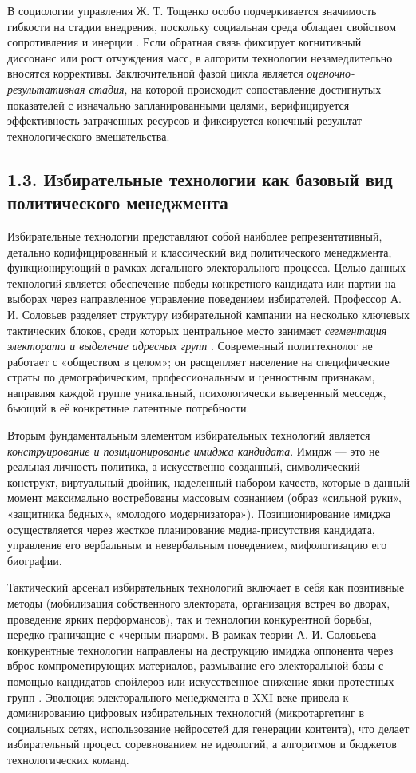 В социологии управления Ж. Т. Тощенко особо подчеркивается значимость гибкости на стадии внедрения, поскольку социальная среда обладает свойством сопротивления и инерции \cite{Toschenko}. Если обратная связь фиксирует когнитивный диссонанс или рост отчуждения масс, в алгоритм технологии незамедлительно вносятся коррективы. Заключительной фазой цикла является \textit{оценочно-результативная стадия}, на которой происходит сопоставление достигнутых показателей с изначально запланированными целями, верифицируется эффективность затраченных ресурсов и фиксируется конечный результат технологического вмешательства.

\subsection{1.3. Избирательные технологии как базовый вид политического менеджмента}

Избирательные технологии представляют собой наиболее репрезентативный, детально кодифицированный и классический вид политического менеджмента, функционирующий в рамках легального электорального процесса. Целью данных технологий является обеспечение победы конкретного кандидата или партии на выборах через направленное управление поведением избирателей. Профессор А. И. Соловьев разделяет структуру избирательной кампании на несколько ключевых тактических блоков, среди которых центральное место занимает \textit{сегментация электората и выделение адресных групп} \cite{Solovyev}. Современный политтехнолог не работает с «обществом в целом»; он расщепляет население на специфические страты по демографическим, профессиональным и ценностным признакам, направляя каждой группе уникальный, психологически выверенный месседж, бьющий в её конкретные латентные потребности.

Вторым фундаментальным элементом избирательных технологий является \textit{конструирование и позиционирование имиджа кандидата}. Имидж — это не реальная личность политика, а искусственно созданный, символический конструкт, виртуальный двойник, наделенный набором качеств, которые в данный момент максимально востребованы массовым сознанием (образ «сильной руки», «защитника бедных», «молодого модернизатора»). Позиционирование имиджа осуществляется через жесткое планирование медиа-присутствия кандидата, управление его вербальным и невербальным поведением, мифологизацию его биографии.

Тактический арсенал избирательных технологий включает в себя как позитивные методы (мобилизация собственного электората, организация встреч во дворах, проведение ярких перформансов), так и технологии конкурентной борьбы, нередко граничащие с «черным пиаром». В рамках теории А. И. Соловьева конкурентные технологии направлены на деструкцию имиджа оппонента через вброс компрометирующих материалов, размывание его электоральной базы с помощью кандидатов-спойлеров или искусственное снижение явки протестных групп \cite{Solovyev}. Эволюция электорального менеджмента в XXI веке привела к доминированию цифровых избирательных технологий (микротаргетинг в социальных сетях, использование нейросетей для генерации контента), что делает избирательный процесс соревнованием не идеологий, а алгоритмов и бюджетов технологических команд.